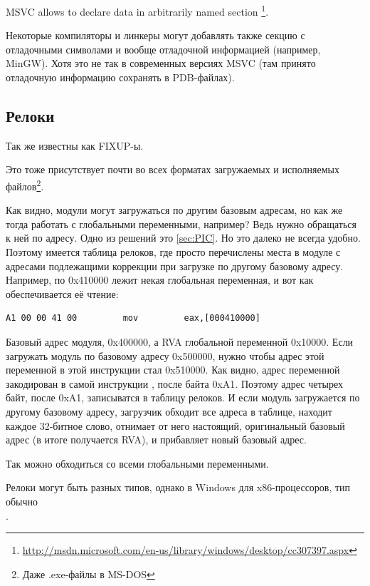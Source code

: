 {\ac{MSVC} allows to declare data in arbitrarily named section}
\footnote{\url{http://msdn.microsoft.com/en-us/library/windows/desktop/cc307397.aspx}}.

Некоторые компиляторы и линкеры могут добавлять также секцию с отладочными символами и вообще отладочной информацией
(например, MinGW).
Хотя это не так в современных версиях \ac{MSVC} (там принято отладочную информацию сохранять в PDB-файлах).

\subsection{Релоки}

Так же известны как FIXUP-ы.

Это тоже присутствует почти во всех форматах загружаемых и исполняемых файлов\footnote{Даже .exe-файлы в MS-DOS}.

Как видно, модули могут загружаться по другим базовым адресам, но как же тогда работать с глобальными переменными,
например? Ведь нужно обращаться к ней по адресу. Одно из решений это \PICcode\ref{sec:PIC}. 
Но это далеко не всегда удобно.
Поэтому имеется таблица релоков, где просто перечислены места в модуле с адресами подлежащими коррекции при загрузке
по другому базовому адресу.
Например, по 0x410000 лежит некая глобальная переменная, и вот как обеспечивается её чтение:

\begin{lstlisting}
A1 00 00 41 00         mov         eax,[000410000]
\end{lstlisting}

Базовый адрес модуля, 0x400000, а \ac{RVA} глобальной переменной 0x10000. Если загружать модуль по базовому адресу
0x500000, нужно чтобы адрес этой переменной в этой инструкции стал 0x510000. Как видно, адрес переменной закодирован
в самой инструкции , после байта 0xA1. Поэтому адрес четырех байт, после 0xA1, записыватся в таблицу релоков.
И если модуль загружается по другому базовому адресу, загрузчик обходит все адреса в таблице, находит каждое 32-битное
слово, отнимает от него настоящий, оригинальный базовый адрес (в итоге получается \ac{RVA}), и прибавляет новый базовый адрес.

Так можно обходиться со всеми глобальными переменными.

Релоки могут быть разных типов, однако в Windows для x86-процессоров, тип обычно \\
.

